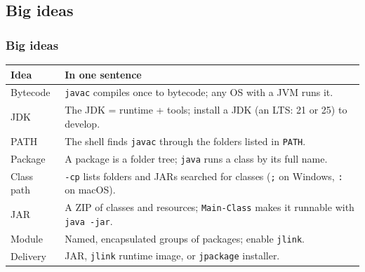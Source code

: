 \documentclass[aspectratio=169,10pt,compress]{beamer}
\begin{document}
\subsection[Ideas]{Big ideas}




\begin{frame}[t,fragile] \frametitle{Big ideas}
  \small
  \begin{tabular}{@{}L{0.22\textwidth}L{0.71\textwidth}@{}}
    \toprule
    \textbf{Idea} & \textbf{In one sentence} \\
    \midrule
    Bytecode        & \texttt{javac} compiles once to bytecode; any OS with a JVM runs it. \\
    JDK             & The JDK = runtime + tools; install a JDK (an LTS: 21 or 25) to develop. \\
    PATH            & The shell finds \texttt{javac} through the folders listed in \texttt{PATH}. \\
    Package         & A package is a folder tree; \texttt{java} runs a class by its full name. \\
    Class path      & \texttt{-cp} lists folders and JARs searched for classes (\texttt{;} on Windows, \texttt{:} on macOS). \\
    JAR             & A ZIP of classes and resources; \texttt{Main-Class} makes it runnable with \texttt{java -jar}. \\
    Module          & Named, encapsulated groups of packages; enable \texttt{jlink}. \\
    Delivery        & JAR, \texttt{jlink} runtime image, or \texttt{jpackage} installer. \\
    \bottomrule
  \end{tabular}
\end{frame}
\end{document}
